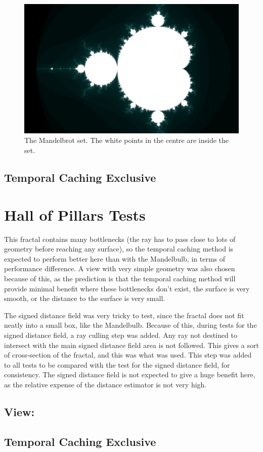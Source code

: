 \begin{figure}[ht]
	\centering
	\includegraphics[width=0.65\linewidth, frame]{Images/Mandelbrot-2D-Full.png}
	\caption{The Mandelbrot set. The white points in the centre are inside the set.}
	\label{figure:mandelbrot-2d-full}
\end{figure}

\subsection{Temporal Caching Exclusive}

\section{Hall of Pillars Tests}

This fractal contains many bottlenecks (the ray has to pass close to lots of geometry before reaching any surface), so the temporal caching method is expected to perform better here than with the Mandelbulb, in terms of performance difference. A view with very simple geometry was also chosen because of this, as the prediction is that the temporal caching method will provide minimal benefit where these bottlenecks don't exist, the surface is very smooth, or the distance to the surface is very small.\newline

The signed distance field was very tricky to test, since the fractal does not fit neatly into a small box, like the Mandelbulb. Because of this, during tests for the signed distance field, a ray culling step was added. Any ray not destined to intersect with the main signed distance field area is not followed. This gives a sort of cross-section of the fractal, and this was what was used. This step was added to all tests to be compared with the test for the signed distance field, for consistency. The signed distance field is not expected to give a huge benefit here, as the relative expense of the distance estimator is not very high.

\subsection{View:}

\subsection{Temporal Caching Exclusive}